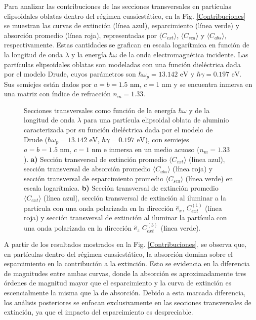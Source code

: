 Para analizar las contribuciones de las secciones transversales en partículas elipsoidales oblatas dentro del régimen cuasiestático, en la Fig. \ref{Contribuciones} se muestran las curvas de extinción (línea azul), esparcimiento (línea verde) y absorción promedio (línea roja), representadas por $\langle C_{ext} \rangle$, $\langle C_{sca} \rangle$ y $\langle C_{abs} \rangle$, respectivamente. Estas cantidades se grafican en escala logarítmica en función de la longitud de onda $\lambda$ y la energía $\hbar\omega$ de la onda electromagnética incidente. Las partículas elipsoidales oblatas son modeladas con una función dieléctrica dada por el modelo Drude, cuyos parámetros son $\hbar\omega_p=13.142\text{ eV}$ y $\hbar\gamma=0.197\text{ eV}$. Sus semiejes están dados por $a=b=1.5\text{ nm}$, $c=1\text{ nm}$ y se encuentra inmersa en una matriz con índice de refracción $n_m=1.33$. \\
\begin{figure}[h!]
	\quad%
	\caption{Secciones transversales como función de la energía $\hbar\omega$ y de la longitud de onda $\lambda$ para una partícula elipsoidal oblata de aluminio caracterizada por su función dieléctrica dada por el modelo de Drude ($\hbar\omega_p=13.142\text{ eV}$, $\hbar\gamma=0.197\text{ eV}$), con semiejes $a=b=1.5\text{ nm}$, $c=1\text{ nm}$ e inmersa en un medio acuoso ($n_m=1.33$). \textbf{a)}  Sección transversal de extinción promedio $\langle C_{ext}\rangle$  (línea azul), sección transversal de absorción promedio $\langle C_{abs}\rangle$  (línea roja) y sección transversal de esparcimiento promedio $\langle C_{sca}\rangle$  (línea verde) en escala logarítmica. \textbf{b)} Sección transversal de extinción promedio $\langle C_{ext}\rangle$ (línea azul), sección transversal de extinción al iluminar a la partícula con una onda polarizada en la dirección $\hat{e}_x$, $C_{ext}^{(1)}$  (línea roja)  y sección transversal de extinción al iluminar la partícula con una onda polarizada en la dirección $\hat{e}_z$ $C_{ext}^{(3)}$  (línea verde).} \label{fig:test}
\end{figure}

A partir de los resultados mostrados en la Fig. \ref{Contribuciones}, se observa que, en partículas dentro del régimen cuasiestático, la absorción domina sobre el esparcimiento en la contribución a la extinción. Esto se evidencia en la diferencia de magnitudes entre ambas curvas, donde la absorción es aproximadamente tres órdenes de magnitud mayor que el esparcimiento y la curva de extinción es escencialmente la misma que la de absorción. Debido a esta marcada diferencia, los análisis posteriores se enfocan exclusivamente en las secciones transversales de extinción, ya que el impacto del esparcimiento es despreciable.\\

